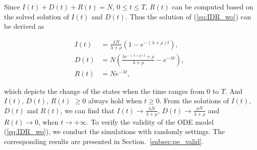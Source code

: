 Since $I(t)+D(t)+R(t)=N$, $0 \le t \le T$,
$R(t)$ can be computed based on the solved solution of $I(t)$ and $D(t)$.
Thus the solution of (\ref{eq:IDR_wo}) can be derived as
\begin{small}
\begin{equation}
\label{eq:IDR_wo_solu}
\begin{aligned}
I(t) &= \frac{ \lambda N }{ \lambda + \rho }(1- e^{-(\lambda + \rho)t}), \\
D(t) &= N (\frac{\lambda e^{-(\lambda + \rho)t} + \rho}{ \lambda + \rho } - e^{- \lambda t}), \\
R(t) &= N e^{- \lambda t},
\end{aligned}
\end{equation}
\end{small}
which depicts the change of the states when the time ranges from $0$ to $T$.
And $I(t)$, $D(t)$, $R(t)$ $\ge 0$ always hold when $t \ge 0$.
From the solutions of $I(t)$, $D(t)$ and $R(t)$,
we can find that $I(t) \rightarrow \frac{ \lambda N }{ \lambda + \rho }$,
$D(t) \rightarrow \frac{ \rho N }{ \lambda + \rho }$
and $R(t) \rightarrow 0$,
when $t \rightarrow + \infty$.
To verify the validity of the ODE model (\ref{eq:IDR_wo}),
we conduct the simulations with randomly settings.
The corresponding results are presented in Section.~\ref{subsec:pe_valid}.

